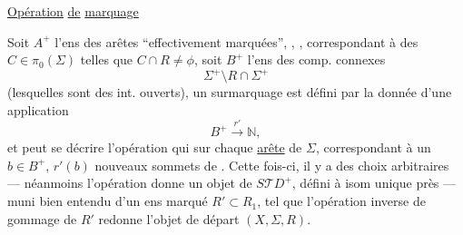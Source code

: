  
\uline{Opération} \uline{de}  \uline{marquage}

Soit $A^+$ l'ens des arêtes  ``effectivement marquées'', ,
,
correspondant à des $C\in\pi_0(\Sigma)$ telles que $C\cap R\ne\phi$, soit $B^+$ l'ens des comp. connexes 
\[
 \Sigma^+\setminus R\cap\Sigma^+
\]
(lesquelles sont des int. ouverts), un surmarquage est défini par la donnée d'une application
\[
 B^+\xrightarrow{r'}\mathbb N,
\]
et peut se décrire   l'opération qui sur chaque
\uline{arête} 
de $\Sigma$, correspondant à un $b\in B^+$, $r'(b)$ nouveaux sommets de  .
Cette fois-ci,  il y a des choix arbitraires --- néanmoins l'opération donne un objet de $S\mathcal TD^+$, défini à isom unique près  --- muni bien entendu d'un ens marqué $R'\subset R_1$, tel que l'opération inverse de gommage de $R'$ redonne l'objet de départ $(X,\Sigma,R)$.

